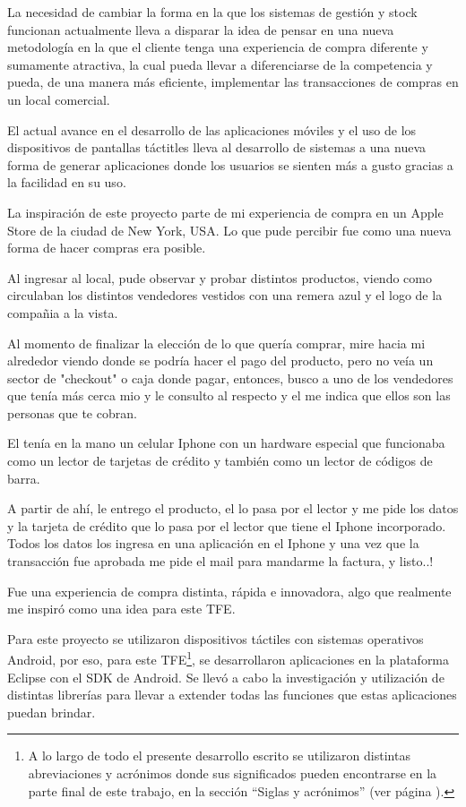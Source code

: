 
La necesidad de cambiar la forma en la que los sistemas de gesti\'on y stock funcionan actualmente lleva a disparar la idea de pensar en una nueva metodolog\'ia en la que el cliente tenga una experiencia de compra diferente y sumamente atractiva, la cual pueda llevar a diferenciarse de la competencia y pueda, de una manera m\'as eficiente, implementar las transacciones de compras en un local comercial.

El actual avance en el desarrollo de las aplicaciones m\'oviles y el uso de los dispositivos de pantallas t\'actitles lleva al desarrollo de sistemas a una nueva forma de generar aplicaciones donde los usuarios se sienten m\'as a gusto gracias a la facilidad en su uso.

La inspiración de este proyecto parte de mi experiencia de compra en un Apple Store de la ciudad de New York, USA. Lo que pude percibir fue como una nueva forma de hacer compras era posible.

Al ingresar al local, pude observar y probar distintos productos, viendo como circulaban los distintos vendedores vestidos con una remera azul y el logo de la compañia a la vista.

Al momento de finalizar la elección de lo que quería comprar, mire hacia mi alrededor viendo donde se podría hacer el pago del producto, pero no veía un sector de "checkout" o caja donde pagar, entonces, busco a uno de los vendedores que tenía más cerca mio y le consulto al respecto y el me indica que ellos son las personas que te cobran.

El tenía en la mano un celular Iphone con un hardware especial que funcionaba como un lector de tarjetas de crédito y también como un lector de códigos de barra.

A partir de ahí, le entrego el producto, el lo pasa por el lector y me pide los datos y la tarjeta de crédito que lo pasa por el lector que tiene el Iphone incorporado. Todos los datos los ingresa en una aplicación en el Iphone y una vez que la transacción fue aprobada me pide el mail para mandarme la factura, y listo..!

Fue una experiencia de compra distinta, rápida e innovadora, algo que realmente me inspiró como una idea para este \ac{TFE}.


Para este proyecto se utilizaron dispositivos t\'actiles con sistemas operativos Android\Si{\texttrademark}, por eso, para este \ac{TFE}\footnote{A lo largo de todo el presente desarrollo escrito se utilizaron distintas abreviaciones y acr\'onimos donde sus significados pueden encontrarse en la parte final de este trabajo, en la secci\'on ``Siglas y acr\'onimos'' (ver p\'agina \pageref{sec:acronimos}).}, se desarrollaron aplicaciones en la plataforma Eclipse\Si{\texttrademark} con el \ac{SDK} de Android\Si{\texttrademark}. Se llev\'o a cabo la investigaci\'on y utilizaci\'on de distintas librer\'ias para llevar a extender todas las funciones que estas aplicaciones puedan brindar.


